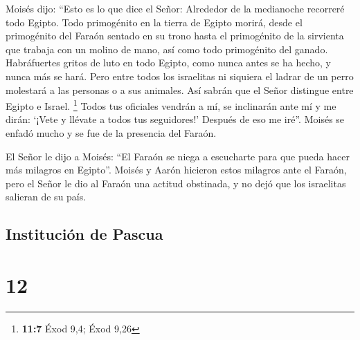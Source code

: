  Moisés dijo: ``Esto es lo que dice el Señor: Alrededor de
la medianoche recorreré todo Egipto.  Todo primogénito en
la tierra de Egipto morirá, desde el primogénito del Faraón sentado en
su trono hasta el primogénito de la sirvienta que trabaja con un molino
de mano, así como todo primogénito del ganado. 
Habráfuertes gritos de luto en todo Egipto, como nunca antes se ha
hecho, y nunca más se hará.  Pero entre todos los
israelitas ni siquiera el ladrar de un perro molestará a las personas o
a sus animales. Así sabrán que el Señor distingue entre Egipto e Israel.
\footnote{\textbf{11:7} Éxod 9,4; Éxod 9,26}  Todos tus
oficiales vendrán a mí, se inclinarán ante mí y me dirán: `¡Vete y
llévate a todos tus seguidores!' Después de eso me iré''. Moisés se
enfadó mucho y se fue de la presencia del Faraón.

 El Señor le dijo a Moisés: ``El Faraón se niega a
escucharte para que pueda hacer más milagros en Egipto''.
 Moisés y Aarón hicieron estos milagros ante el Faraón,
pero el Señor le dio al Faraón una actitud obstinada, y no dejó que los
israelitas salieran de su país.

\hypertarget{instituciuxf3n-de-pascua}{%
\subsection{Institución de Pascua}\label{instituciuxf3n-de-pascua}}

\hypertarget{section-11}{%
\section{12}\label{section-11}}

